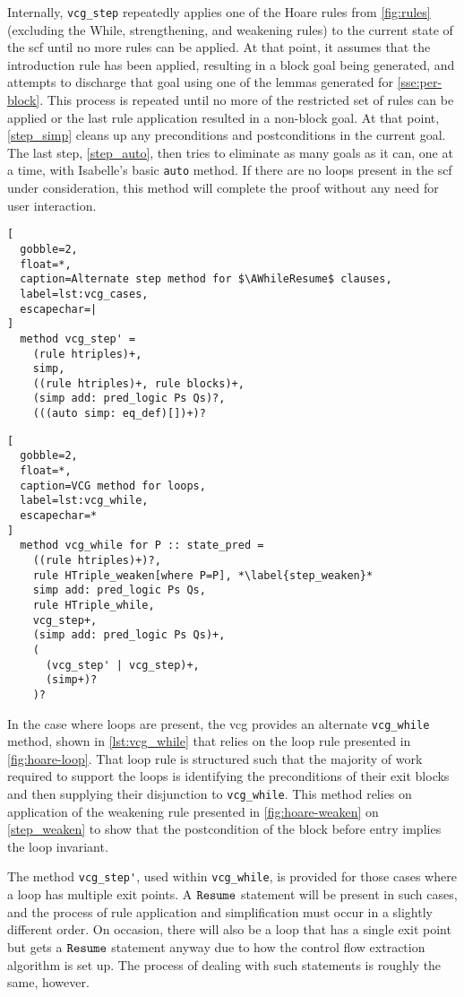 Internally, \lstinline|vcg_step| repeatedly applies one of the Hoare rules
from \cref{fig:rules} (excluding the While, strengthening, and weakening rules)
to the current state of the \ac{scf} until no more rules can be applied.
At that point, it assumes that the introduction rule has been applied,
resulting in a block goal being generated, and attempts to discharge that goal
using one of the lemmas generated for \cref{sse:per-block}.
This process is repeated until no more of the restricted set of rules can be applied
or the last rule application resulted in a non-block goal.
At that point, \cref{step_simp} cleans up any preconditions and postconditions
in the current goal.
The last step, \cref{step_auto}, then tries to eliminate as many goals as it can,
one at a time, with Isabelle's basic \lstinline|auto| method.
If there are no loops present in the \ac{scf} under consideration,
this method will complete the proof without any need for user interaction.

\begin{lstlisting}[
  gobble=2,
  float=*,
  caption=Alternate step method for $\AWhileResume$ clauses,
  label=lst:vcg_cases,
  escapechar=|
]
  method vcg_step' =
    (rule htriples)+,
    simp,
    ((rule htriples)+, rule blocks)+,
    (simp add: pred_logic Ps Qs)?,
    (((auto simp: eq_def)[])+)?
\end{lstlisting}
\begin{lstlisting}[
  gobble=2,
  float=*,
  caption=VCG method for loops,
  label=lst:vcg_while,
  escapechar=*
]
  method vcg_while for P :: state_pred =
    ((rule htriples)+)?,
    rule HTriple_weaken[where P=P], *\label{step_weaken}*
    simp add: pred_logic Ps Qs,
    rule HTriple_while,
    vcg_step+,
    (simp add: pred_logic Ps Qs)+,
    (
      (vcg_step' | vcg_step)+,
      (simp+)?
    )?
\end{lstlisting}
In the case where loops are present,
the \ac{vcg} provides an alternate \lstinline|vcg_while| method,
shown in \cref{lst:vcg_while}
that relies on the loop rule presented in \cref{fig:hoare-loop}.
That loop rule is structured such that
the majority of work required to support the loops
is identifying the preconditions of their exit blocks
and then supplying their disjunction to \lstinline|vcg_while|.
This method relies on application of the weakening rule
presented in \cref{fig:hoare-weaken} on \cref{step_weaken}
to show that the postcondition of the block before entry implies the loop invariant.

The method \lstinline|vcg_step'|, used within \lstinline|vcg_while|,
is provided for those cases where a loop has multiple exit points.
A $\texttt{Resume}$ statement will be present in such cases,
and the process of rule application and simplification must occur
in a slightly different order. On occasion, there will also be a loop that has a single
exit point but gets a $\texttt{Resume}$ statement anyway
due to how the control flow extraction algorithm is set up.
The process of dealing with such statements is roughly the same, however.

